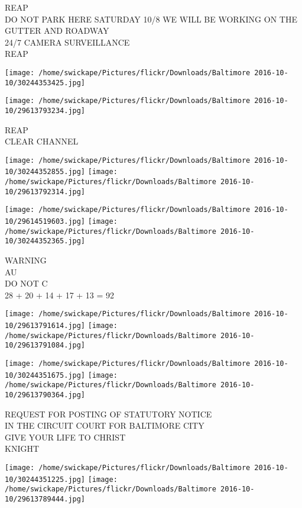 \documentclass[10pt,letterpaper]{article}
\begin{document}
REAP\\
DO NOT PARK HERE SATURDAY 10/8 WE WILL BE WORKING ON THE GUTTER AND ROADWAY\\
24/7 CAMERA SURVEILLANCE\\
REAP\\
\pagebreak

\texttt{[image: /home/swickape/Pictures/flickr/Downloads/Baltimore 2016-10-10/30244353425.jpg]}

\vspace{0.25in}
\texttt{[image: /home/swickape/Pictures/flickr/Downloads/Baltimore 2016-10-10/29613793234.jpg]}

REAP\\
CLEAR CHANNEL\\
\pagebreak

\texttt{[image: /home/swickape/Pictures/flickr/Downloads/Baltimore 2016-10-10/30244352855.jpg]}
\texttt{[image: /home/swickape/Pictures/flickr/Downloads/Baltimore 2016-10-10/29613792314.jpg]}

\texttt{[image: /home/swickape/Pictures/flickr/Downloads/Baltimore 2016-10-10/29614519603.jpg]}
\texttt{[image: /home/swickape/Pictures/flickr/Downloads/Baltimore 2016-10-10/30244352365.jpg]}

WARNING\\
AU\\
DO NOT C\\
28 + 20 + 14 + 17 + 13 = 92\\
\pagebreak

\texttt{[image: /home/swickape/Pictures/flickr/Downloads/Baltimore 2016-10-10/29613791614.jpg]}
\texttt{[image: /home/swickape/Pictures/flickr/Downloads/Baltimore 2016-10-10/29613791084.jpg]}

\texttt{[image: /home/swickape/Pictures/flickr/Downloads/Baltimore 2016-10-10/30244351675.jpg]}
\texttt{[image: /home/swickape/Pictures/flickr/Downloads/Baltimore 2016-10-10/29613790364.jpg]}

REQUEST FOR POSTING OF STATUTORY NOTICE\\
IN THE CIRCUIT COURT FOR BALTIMORE CITY\\
GIVE YOUR LIFE TO CHRIST\\
KNIGHT\\
\pagebreak

\texttt{[image: /home/swickape/Pictures/flickr/Downloads/Baltimore 2016-10-10/30244351225.jpg]}
\texttt{[image: /home/swickape/Pictures/flickr/Downloads/Baltimore 2016-10-10/29613789444.jpg]}
\end{document}
